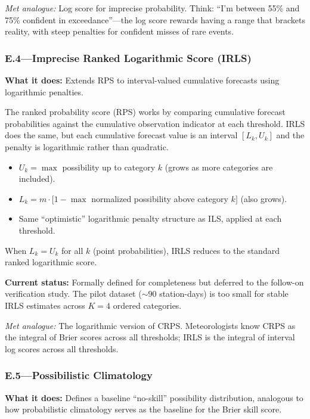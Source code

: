 \textit{Met analogue:} Log score for imprecise probability. Think: ``I'm between 55\% and 75\% confident in exceedance''---the log score rewards having a range that brackets reality, with steep penalties for confident misses of rare events.

\subsubsection{E.4---Imprecise Ranked Logarithmic Score (IRLS)}\label{sec:plain_e4}

\textbf{What it does:} Extends RPS to interval-valued cumulative forecasts using logarithmic penalties.

The ranked probability score (RPS) works by comparing cumulative forecast probabilities against the cumulative observation indicator at each threshold. IRLS does the same, but each cumulative forecast value is an interval $[L_k, U_k]$ and the penalty is logarithmic rather than quadratic.

\begin{itemize}[leftmargin=2em]
\item $U_k = \max$ possibility up to category $k$ (grows as more categories are included).
\item $L_k = m \cdot [1 - \max$ normalized possibility above category $k]$ (also grows).
\item Same ``optimistic'' logarithmic penalty structure as ILS, applied at each threshold.
\end{itemize}

When $L_k = U_k$ for all $k$ (point probabilities), IRLS reduces to the standard ranked logarithmic score.

\textbf{Current status:} Formally defined for completeness but deferred to the follow-on verification study. The pilot dataset (${\sim}90$ station-days) is too small for stable IRLS estimates across $K = 4$ ordered categories.

\textit{Met analogue:} The logarithmic version of CRPS. Meteorologists know CRPS as the integral of Brier scores across all thresholds; IRLS is the integral of interval log scores across all thresholds.

\subsubsection{E.5---Possibilistic Climatology}\label{sec:plain_e5}

\textbf{What it does:} Defines a baseline ``no-skill'' possibility distribution, analogous to how probabilistic climatology serves as the baseline for the Brier skill score.

